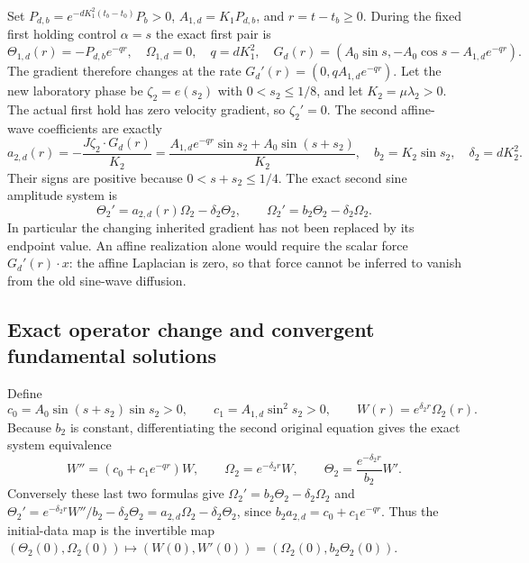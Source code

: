 Set $P_{d,b}=e^{-dK_1^2(t_b-t_0)}P_b>0$,
$A_{1,d}=K_1P_{d,b}$, and $r=t-t_b\geq0$.
During the fixed first holding control $\alpha=s$ the exact first
pair is
\[
 \Theta_{1,d}(r)=-P_{d,b}e^{-qr},\quad\Omega_{1,d}=0,
 \quad q=dK_1^2,
 \quad G_d(r)=(A_0\sin s,-A_0\cos s-A_{1,d}e^{-qr}).
\]
The gradient therefore changes at the rate
$G_d'(r)=(0,qA_{1,d}e^{-qr})$.
Let the new laboratory phase be $\zeta_2=e(s_2)$ with
$0<s_2\leq1/8$, and let $K_2=\mu\lambda_2>0$.
The actual first hold has zero velocity gradient, so $\zeta_2'=0$.
The second affine-wave coefficients are exactly
\begin{equation}
 a_{2,d}(r)=-\frac{J\zeta_2\cdot G_d(r)}{K_2}
 =\frac{A_{1,d}e^{-qr}\sin s_2+A_0\sin(s+s_2)}{K_2},\quad
 b_2=K_2\sin s_2,\quad\delta_2=dK_2^2.
 \label{cvlane:eq:cv-feedback-coefficients}
\end{equation}
Their signs are positive because $0<s+s_2\leq1/4$.
The exact second sine amplitude system is
\begin{equation}
 \Theta_2'=a_{2,d}(r)\Omega_2-\delta_2\Theta_2,
 \qquad\Omega_2'=b_2\Theta_2-\delta_2\Omega_2.
 \label{cvlane:eq:cv-feedback-pair}
\end{equation}
In particular the changing inherited gradient has not been replaced
by its endpoint value. An affine realization alone would require the
scalar force $G_d'(r)\cdot x$: the affine Laplacian is zero, so that
force cannot be inferred to vanish from the old sine-wave diffusion.

\subsection{Exact operator change and convergent fundamental solutions}

Define
\[
 c_0=A_0\sin(s+s_2)\sin s_2>0,\qquad
 c_1=A_{1,d}\sin^2s_2>0,\qquad W(r)=e^{\delta_2r}\Omega_2(r).
\]
Because $b_2$ is constant, differentiating the second original
equation gives the exact system equivalence
\begin{equation}
 W''=(c_0+c_1e^{-qr})W,\qquad
 \Omega_2=e^{-\delta_2r}W,\qquad
 \Theta_2=\frac{e^{-\delta_2r}}{b_2}W'.
 \label{cvlane:eq:cv-feedback-scalar-map}
\end{equation}
Conversely these last two formulas give
$\Omega_2'=b_2\Theta_2-\delta_2\Omega_2$ and
$\Theta_2'=e^{-\delta_2r}W''/b_2-\delta_2\Theta_2
=a_{2,d}\Omega_2-\delta_2\Theta_2$, since
$b_2a_{2,d}=c_0+c_1e^{-qr}$.
Thus the initial-data map is the invertible map
$(\Theta_2(0),\Omega_2(0))\mapsto(W(0),W'(0))
=(\Omega_2(0),b_2\Theta_2(0))$.

